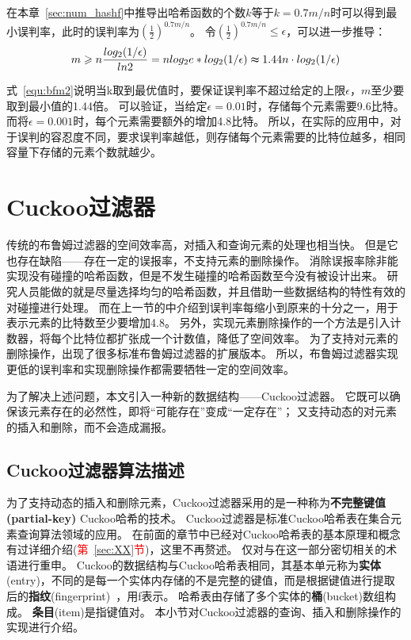 在本章~\ref{sec:num_hashf}中推导出哈希函数的个数$k$等于$k = 0.7{m/n}$时可以得到最小误判率，此时的误判率为$(\frac{1}{2})^{0.7{m/n}}$。
令$(\frac{1}{2})^{0.7{m/n}} \leq \epsilon $，可以进一步推导：
\begin{equation}
m \geq n\frac{log_2({1/\epsilon})}{ln2} = nlog_2e\ast log_2({1/\epsilon}) \thickapprox 1.44n\cdot log_2({1/\epsilon})
\label{equ:bfm2}
\end{equation}

式~\ref{equ:bfm2}说明当k取到最优值时，要保证误判率不超过给定的上限$\epsilon$，$m$至少要取到最小值的1.44倍。
可以验证，当给定$\epsilon = 0.01$时，存储每个元素需要9.6比特。
而将$\epsilon = 0.001 $时，每个元素需要额外的增加4.8比特。
所以，在实际的应用中，对于误判的容忍度不同，要求误判率越低，则存储每个元素需要的比特位越多，相同容量下存储的元素个数就越少。

\section{Cuckoo过滤器}
传统的布鲁姆过滤器的空间效率高，对插入和查询元素的处理也相当快。
但是它也存在缺陷——存在一定的误报率，不支持元素的删除操作。
消除误报率除非能实现没有碰撞的哈希函数，但是不发生碰撞的哈希函数至今没有被设计出来。
研究人员能做的就是尽量选择均匀的哈希函数，并且借助一些数据结构的特性有效的对碰撞进行处理。
而在上一节的中介绍到误判率每缩小到原来的十分之一，用于表示元素的比特数至少要增加4.8。
另外，实现元素删除操作的一个方法是引入计数器，将每个比特位都扩张成一个计数值，降低了空间效率。
为了支持对元素的删除操作，出现了很多标准布鲁姆过滤器的扩展版本\cite{bender2012don,bonomi2006improved,fan2000summary}。
所以，布鲁姆过滤器实现更低的误判率和实现删除操作都需要牺牲一定的空间效率。

为了解决上述问题，本文引入一种新的数据结构——Cuckoo过滤器。
它既可以确保该元素存在的必然性，即将“可能存在”变成“一定存在”；
又支持动态的对元素的插入和删除，而不会造成漏报。

\subsection{Cuckoo过滤器算法描述}
\label{sec:cbf_algo}
为了支持动态的插入和删除元素，Cuckoo过滤器采用的是一种称为\textbf{不完整键值(partial-key)} Cuckoo哈希的技术。
Cuckoo过滤器是标准Cuckoo哈希表在集合元素查询算法领域的应用。
在前面的章节中已经对Cuckoo哈希表的基本原理和概念有过详细介绍(\textcolor{red}{第~\ref{sec:XX}节})，这里不再赘述。
仅对与在这一部分密切相关的术语进行重申。
Cuckoo的数据结构与Cuckoo哈希表相同，其基本单元称为\textbf{实体}(entry)，不同的是每一个实体内存储的不是完整的键值，而是根据键值进行提取后的\textbf{指纹}(fingerprint)~\cite{memc3}，用f表示。
哈希表由存储了多个实体的\textbf{桶}(bucket)数组构成。
\textbf{条目}(item)是指键值对。
本小节对Cuckoo过滤器的查询、插入和删除操作的实现进行介绍。

